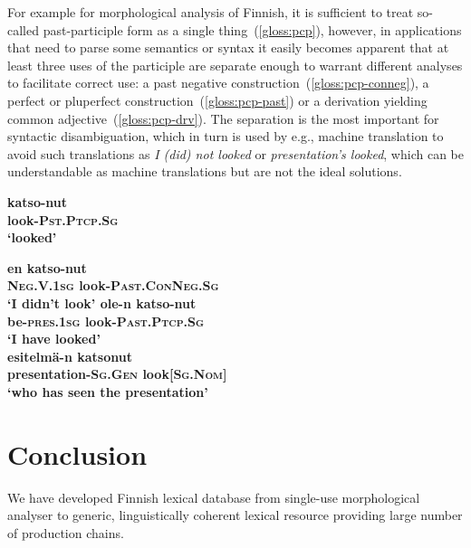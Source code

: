 \documentclass[11pt]{article}
\newif\ifcameraready
\begin{document}
For example for morphological analysis of Finnish, it is sufficient to treat
so-called past-participle form as a single thing~(\ref{gloss:pcp}),
however, in applications that need to parse some semantics or syntax it easily
becomes apparent that at least three uses of the participle are separate enough
to warrant different analyses to facilitate correct use: a past negative
construction~(\ref{gloss:pcp-conneg}), a perfect or pluperfect
construction~(\ref{gloss:pcp-past}) or a derivation yielding
common adjective~(\ref{gloss:pcp-drv}). The separation is the
most important for syntactic disambiguation, which in turn is used by e.g.,
machine translation to avoid such translations as \emph{I (did) not looked} or
\emph{presentation's looked}, which can be understandable as machine
translations but are not the ideal solutions.

\begin{exe}
    \ex \label{gloss:pcp}
    \gll \bf katso-nut \\
    \small look-\textsc{Pst.Ptcp.Sg} \\
\glt `looked'
\end{exe}

\begin{exe}
    \ex \label{gloss:pcp-conneg}
    \gll \bf en \bf katso-nut \\
    \small \textsc{Neg.V.1sg} \small look-\textsc{Past.ConNeg.Sg} \\
    \glt `I didn't look'
    \ex \label{gloss:pcp-past}
    \gll \bf ole-n \bf katso-nut \\
    \small be-\textsc{pres.1sg} \small look-\textsc{Past.Ptcp.Sg} \\
    \glt `I have looked' \\
    \ex \label{gloss:pcp-drv}
    \gll \bf esitelmä-n \bf katsonut \\
    \small presentation-\textsc{Sg.Gen} \small look[\textsc{Sg.Nom}] \\
    \glt `who has seen the presentation'
\end{exe}

\section{Conclusion}

We have developed Finnish lexical database from single-use morphological
analyser to generic, linguistically coherent lexical resource providing
large number of production chains.


\ifcameraready
\section*{Acknowledgements}


\fi



\end{document}
